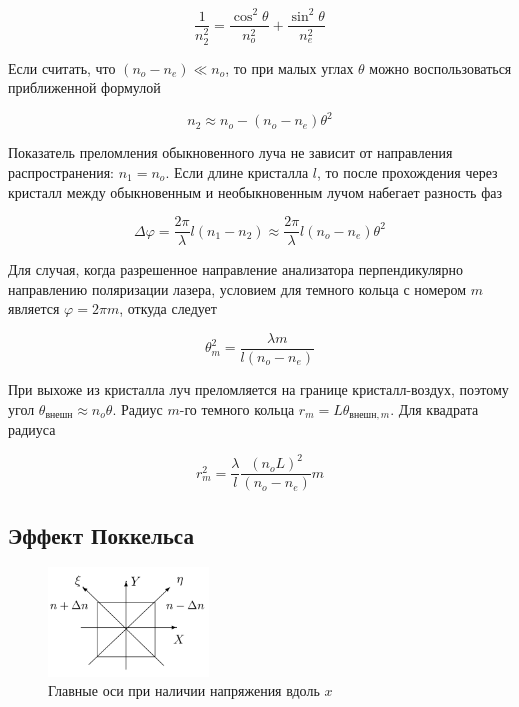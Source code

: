 \documentclass{article}
\begin{document}
\begin{equation}
    \frac{1}{n_2^2} = \frac{\cos^2 \theta}{n_o^2} + \frac{\sin^2 \theta}{n_e^2}
    \label{eq:pokazatel_prelomlenia}
\end{equation}

Если считать, что $(n_o - n_e) \ll n_o$, то при малых углах $\theta$ можно
воспользоваться приближенной формулой

\begin{equation}
    n_2 \approx n_o - (n_o - n_e) \theta^2
    \label{eq:pokazatel_prelomlenia_approx}
\end{equation}

Показатель преломления обыкновенного луча не зависит от направления распространения:
$n_1 = n_o$. Если длине кристалла $l$, то после прохождения через кристалл между
обыкновенным и необыкновенным лучом набегает разность фаз

\begin{equation}
    \Delta \varphi = \frac{2\pi}{\lambda} l (n_1 - n_2) \approx
    \frac{2\pi}{\lambda} l (n_o - n_e) \theta^2
    \label{eq:raznost_faz}
\end{equation}

Для случая, когда разрешенное направление анализатора перпендикулярно направлению
поляризации лазера, условием для темного кольца с номером $m$ является
$\varphi = 2\pi m$, откуда следует

\begin{equation}
    \theta_m^2 = \frac{\lambda m}{l(n_o - n_e)}
    \label{eq:theta_m}
\end{equation}

При выхоже из кристалла луч преломляется на границе кристалл-воздух, поэтому угол
$\theta_{внешн} \approx n_o \theta$. Радиус $m$-го темного кольца
$r_m = L\theta_{внешн, m}$. Для квадрата радиуса

\begin{equation}
    r_m^2 = \frac{\lambda}{l} \frac{{(n_o L)}^2}{(n_o - n_e)} m
    \label{eq:r_m}
\end{equation}

\newpage
\subsection{Эффект Поккельса}

\begin{figure}
  \begin{center}
    \includegraphics[width=0.38\textwidth]{pokkels_axes.png}
  \end{center}
  \caption{Главные оси при наличии напряжения вдоль $x$}\label{fig:pokkels_axes}
\end{figure}
\end{document}
